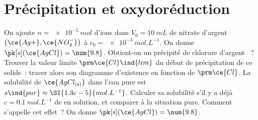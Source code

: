 \documentclass[a4paper, 10pt, final, garamond]{book}
\begin{document}
\setcounter{chapter}{21}


\chapter{Précipitation et oxydoréduction}

\begin{enumerate}[label=\sqenumi]
	On ajoute $n = \SI{e-5}{mol}$ d'ions  dans $V_0 = \SI{10}{mL}$ de
	nitrate d'argent $\left( \ce{Ag+},\ce{NO_3^-} \right)$ à $c_0 =
		\SI{e-3}{mol.L^{-1}}$. On donne $\pk[s](\ce{AgCl}) = \num{9.8}$. Obtient-on un
	précipité de chlorure d'argent ~? Trouver la valeur limite $\prm
		\ce{Cl}\ind{lim}$ du début de précipitation de ce solide~; tracer alors son
	diagramme d'existence en fonction de $\prm \ce{Cl}$.
	\smallbreak
	\vspace{-20pt}
	La solubilité de $\ce{AgCl_{\rm(s)}}$ dans l'eau pure est $s\ind{pur} \approx
		\SI{1.3e-5}{mol.L^{-1}}$. Calculer sa solubilité s'il y a déjà $c = \SI{0.1}{mol.L^{-1}}$ de  en solution, et comparer à la situation pure. Comment s'appelle cet effet~? On donne $\pk[s](\ce{AgCl}) = \num{9.8}$.
	\smallbreak
	\psw{
		\noindent
		\begin{isd}
			\psw{
				\begin{enumerate}[label=\sqenumi]

\end{enumerate}}
\end{isd}}
\end{enumerate}
\end{document}
